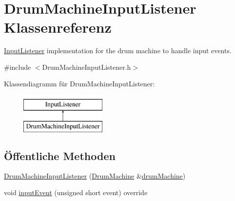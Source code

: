 \hypertarget{class_drum_machine_input_listener}{}\section{Drum\+Machine\+Input\+Listener Klassenreferenz}
\label{class_drum_machine_input_listener}


\hyperlink{class_input_listener}{Input\+Listener} implementation for the drum machine to handle input events.  




{\ttfamily \#include $<$Drum\+Machine\+Input\+Listener.\+h$>$}

Klassendiagramm für Drum\+Machine\+Input\+Listener\+:\begin{figure}[H]
\begin{center}
\leavevmode
\includegraphics[height=2.000000cm]{class_drum_machine_input_listener}
\end{center}
\end{figure}
\subsection*{Öffentliche Methoden}
\begin{DoxyCompactItemize}
\item 
\hyperlink{class_drum_machine_input_listener_a7552c36ebae9e6ae49f8929ae9853354}{Drum\+Machine\+Input\+Listener} (\hyperlink{class_drum_machine}{Drum\+Machine} \&\hyperlink{class_drum_machine_input_listener_ae3f80aad0a5c4b2e4ad2712423102feb}{drum\+Machine})
\item 
void \hyperlink{class_drum_machine_input_listener_a44a620b09b35885a26befe84fa6e1ab0}{input\+Event} (unsigned short event) override
\end{DoxyCompactItemize}
